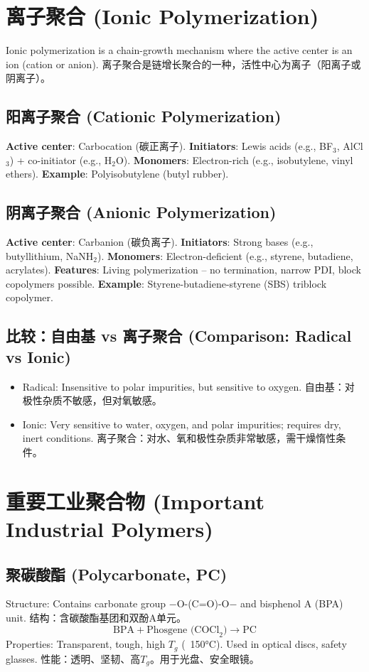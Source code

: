 \documentclass[12pt,a4paper]{ctexart}
\begin{document}
\section{离子聚合 (Ionic Polymerization)}

Ionic polymerization is a chain-growth mechanism where the active center is an ion (cation or anion).  
离子聚合是链增长聚合的一种，活性中心为离子（阳离子或阴离子）。

\subsection{阳离子聚合 (Cationic Polymerization)}
\textbf{Active center}: Carbocation (碳正离子).  
\textbf{Initiators}: Lewis acids (e.g., BF$_3$, AlCl$_3$) + co-initiator (e.g., H$_2$O).  
\textbf{Monomers}: Electron-rich (e.g., isobutylene, vinyl ethers).  
\textbf{Example}: Polyisobutylene (butyl rubber).  

\subsection{阴离子聚合 (Anionic Polymerization)}
\textbf{Active center}: Carbanion (碳负离子).  
\textbf{Initiators}: Strong bases (e.g., butyllithium, NaNH$_2$).  
\textbf{Monomers}: Electron-deficient (e.g., styrene, butadiene, acrylates).  
\textbf{Features}: Living polymerization – no termination, narrow PDI, block copolymers possible.  
\textbf{Example}: Styrene-butadiene-styrene (SBS) triblock copolymer.

\subsection{比较：自由基 vs 离子聚合 (Comparison: Radical vs Ionic)}
\begin{itemize}
    \item Radical: Insensitive to polar impurities, but sensitive to oxygen.  
      自由基：对极性杂质不敏感，但对氧敏感。
    \item Ionic: Very sensitive to water, oxygen, and polar impurities; requires dry, inert conditions.  
      离子聚合：对水、氧和极性杂质非常敏感，需干燥惰性条件。
\end{itemize}

\section{重要工业聚合物 (Important Industrial Polymers)}

\subsection{聚碳酸酯 (Polycarbonate, PC)}
Structure: Contains carbonate group $-$O-(C=O)-O$-$ and bisphenol A (BPA) unit.  
结构：含碳酸酯基团和双酚A单元。
\[
\text{BPA} + \text{Phosgene (COCl}_2\text{)} \rightarrow \text{PC}
\]
Properties: Transparent, tough, high $T_g$ (~150°C). Used in optical discs, safety glasses.  
性能：透明、坚韧、高$T_g$。用于光盘、安全眼镜。
\end{document}
